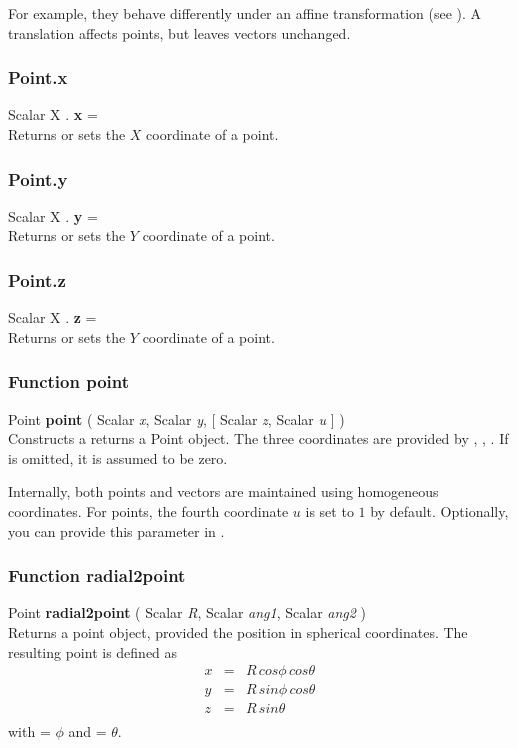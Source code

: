 For example, they behave differently under an affine transformation (see ). A translation affects points, but leaves vectors unchanged.

\subsubsection{Point.x \label{F:Point:x}}
Scalar X . \textbf{x} = \\
Returns or sets the $X$ coordinate of a point.

\subsubsection{Point.y \label{F:Point:y}}
Scalar X . \textbf{y} = \\
Returns or sets the $Y$ coordinate of a point.

\subsubsection{Point.z \label{F:Point:z}}
Scalar X . \textbf{z} = \\
Returns or sets the $Y$ coordinate of a point.

\subsubsection{Function point \label{F:point}}
Point \textbf{point} ( Scalar \textit{x}, Scalar \textit{y},  [ Scalar \textit{z}, Scalar \textit{u} ] ) \\
Constructs a returns a Point object. The three coordinates are provided by , , . If  is omitted, it is assumed to be zero.


Internally, both points and vectors are maintained using homogeneous coordinates. For points, the fourth coordinate $u$ is set to $1$ by default. Optionally, you can provide this parameter in .

\subsubsection{Function radial2point \label{F:radial2point}}
Point \textbf{radial2point} ( Scalar \textit{R}, Scalar \textit{ang1}, Scalar \textit{ang2} ) \\
Returns a point object, provided the position in spherical coordinates.
The resulting point is defined as
\begin{equation}
\begin{array}{rcl}
x &=& R \, cos \phi \, cos \theta \\
y &=& R \, sin \phi \, cos \theta \\
z &=& R \, sin \theta \\
\end{array}
\end{equation}
with  = $\phi$ and  = $\theta$.


